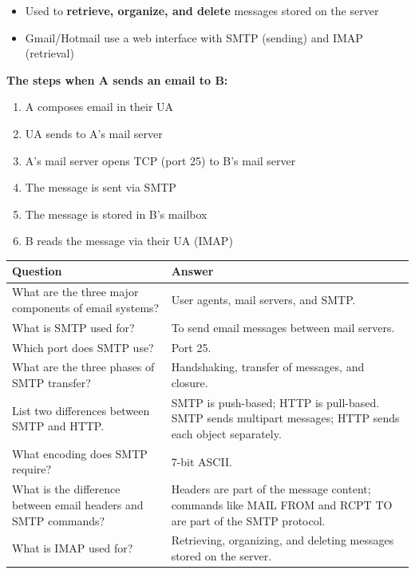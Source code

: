 \begin{keybox}
\begin{itemize}[noitemsep]
    \item Used to \textbf{retrieve, organize, and delete} messages stored on the server
    \item Gmail/Hotmail use a web interface with SMTP (sending) and IMAP (retrieval)
\end{itemize}
\end{keybox}

\textbf{The steps when A sends an email to B:}
\begin{enumerate}[noitemsep]
    \item A composes email in their UA
    \item UA sends to A's mail server
    \item A's mail server opens TCP (port 25) to B's mail server
    \item The message is sent via SMTP
    \item The message is stored in B's mailbox
    \item B reads the message via their UA (IMAP)
\end{enumerate}

\begin{exambox}
\small
\begin{longtable}{p{7cm}p{7cm}}
\toprule
\textbf{Question} & \textbf{Answer} \\
\midrule
\endhead
What are the three major components of email systems? & User agents, mail servers, and SMTP. \\
\midrule
What is SMTP used for? & To send email messages between mail servers. \\
\midrule
Which port does SMTP use? & Port 25. \\
\midrule
What are the three phases of SMTP transfer? & Handshaking, transfer of messages, and closure. \\
\midrule
List two differences between SMTP and HTTP. & SMTP is push-based; HTTP is pull-based. SMTP sends multipart messages; HTTP sends each object separately. \\
\midrule
What encoding does SMTP require? & 7-bit ASCII. \\
\midrule
What is the difference between email headers and SMTP commands? & Headers are part of the message content; commands like MAIL FROM and RCPT TO are part of the SMTP protocol. \\
\midrule
What is IMAP used for? & Retrieving, organizing, and deleting messages stored on the server. \\
\bottomrule
\end{longtable}
\end{exambox}



